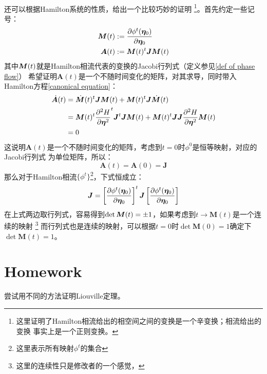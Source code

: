     \paragraph{}
    还可以根据Hamilton系统的性质，给出一个比较巧妙的证明
    \footnote{
        这里证明了Hamilton相流给出的相空间之间的变换是一个辛变换；相流给出的变换
        事实上是一个正则变换。
    }。首先约定一些记号：
    \begin{equation}
        \begin{split}
            \bm{M}(t) &:= \frac{\partial{\phi^t(\bm{\eta}_0)}}{\partial{\bm{\eta}_0}}\\
            \bm{A}(t) &:= \bm{M}(t)^t\bm{J}\bm{M}(t)
        \end{split}
    \end{equation}
    其中$\displaystyle\bm{M}(t)$就是Hamilton相流代表的变换的Jacobi行列式（定义参见\ref{def of phase flow}）
    希望证明$\bm{A}(t)$是一个不随时间变化的矩阵，对其求导，同时带入Hamilton方程\ref{canonical equation}：
    \begin{equation}
        \begin{split}
            \dot{\bm{A}}(t) &= \dot{\bm{M}}(t)^t\bm{J}\bm{M}(t) + \bm{M}(t)^t\bm{J}\dot{\bm{M}}(t)\\
            &= \bm{M}(t)^t\frac{\partial{^2 H}}{\partial{\bm{\eta}^2}}^t \bm{J}^t\bm{J}\bm{M}(t) + \bm{M}(t)^t\bm{J}\bm{J}
            \frac{\partial{^2 H}}{\partial{\bm{\eta}^2}}\bm{M}(t)\\
            &= 0
        \end{split}
    \end{equation}
    这说明$\bm{A}(t)$是一个不随时间变化的矩阵，考虑到$t=0$时$\phi^0$是恒等映射，对应的Jacobi行列式
    为单位矩阵，所以：
    \begin{equation}
        \bm{A}(t) = \bm{A}(0) = \bm{J}
    \end{equation}
    那么对于Hamilton相流$\{\phi^t\}$\footnote{这里表示所有映射$\phi^t$的集合}，下式恒成立：
    \begin{equation}
        \bm{J} = \left[\frac{\partial{\phi^t(\bm{\eta}_0)}}{\partial{\bm{\eta}_0}}\right]^t \bm{J} \left[\frac{\partial{\phi^t(\bm{\eta}_0)}}{\partial{\bm{\eta}_0}}\right]
    \end{equation}
    在上式两边取行列式，容易得到$\displaystyle\det\bm{M}(t) = \pm 1$，如果考虑到$t\to\bm{M}(t)$是一个连续的映射
    \footnote{这里的连续性只是修改者的一个感觉，}
    而行列式也是连续的映射，可以根据$t=0$时$\det\bm{M}(0) = 1$确定下$\det\bm{M}(t) = 1$。
    \section{Homework}
    \begin{asg}
        尝试用不同的方法证明Liouville定理。
    \end{asg}


    
    